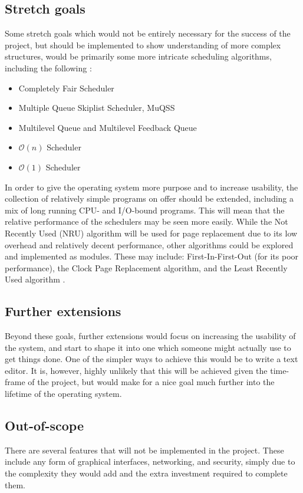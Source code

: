 \documentclass[10pt,a4paper]{article}
\begin{document}
\subsection*{Stretch goals}
Some stretch goals which would not be entirely necessary for the success of the
project, but should be implemented to show understanding of more complex
structures, would be primarily some more intricate scheduling algorithms,
including the following \cite{CFS,BFS,DinosaurCPU,O(n)Scheduler,O(1)Scheduler}:
\begin{itemize}
    \item Completely Fair Scheduler
    \item Multiple Queue Skiplist Scheduler, MuQSS
    \item Multilevel Queue and Multilevel Feedback Queue
    \item $\mathcal{O}(n)$ Scheduler
    \item $\mathcal{O}(1)$ Scheduler
\end{itemize}

In order to give the operating system more purpose and to increase usability,
the collection of relatively simple programs on offer should be extended,
including a mix of long running CPU- and I/O-bound programs. This will mean
that the relative performance of the schedulers may be seen more easily. While
the Not Recently Used (NRU) algorithm will be used for page replacement due to
its low overhead and relatively decent performance, other algorithms could be
explored and implemented as modules. These may include: First-In-First-Out (for
its poor performance), the Clock Page Replacement algorithm, and the Least
Recently Used algorithm \cite{PageReplacement}.

\subsection*{Further extensions}
Beyond these goals, further extensions would focus on increasing the usability
of the system, and start to shape it into one which someone might actually use
to get things done. One of the simpler ways to achieve this would be to write a
text editor. It is, however, highly unlikely that this will be achieved given
the time-frame of the project, but would make for a nice goal much further into
the lifetime of the operating system.

\subsection*{Out-of-scope}
There are several features that will not be implemented in the project. These
include any form of graphical interfaces, networking, and security, simply due
to the complexity they would add and the extra investment required to complete
them.
\end{document}
